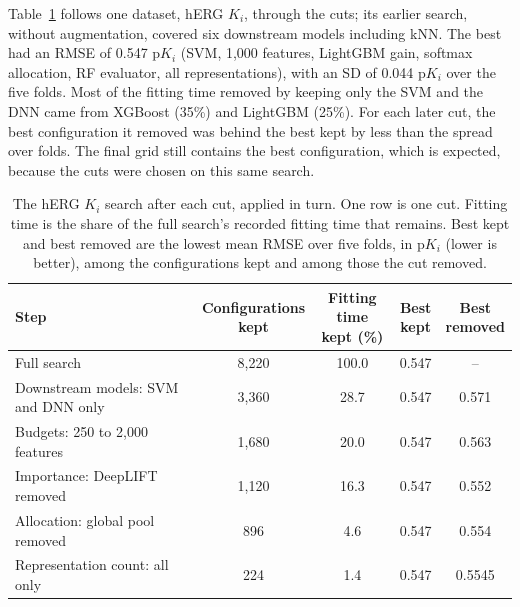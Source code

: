 \label{app:add:cut_walkthrough}
Table~\ref{tab:cut_walkthrough} follows one dataset, hERG $K_i$, through the cuts; its earlier search, without augmentation, covered six downstream models including kNN. The best had an RMSE of 0.547 p$K_i$ (SVM, 1,000 features, LightGBM gain, softmax allocation, RF evaluator, all representations), with an SD of 0.044 p$K_i$ over the five folds. Most of the fitting time removed by keeping only the SVM and the DNN came from XGBoost (35\%) and LightGBM (25\%). For each later cut, the best configuration it removed was behind the best kept by less than the spread over folds. The final grid still contains the best configuration, which is expected, because the cuts were chosen on this same search.

\begin{table}[htbp]
\centering
\small
\begin{adjustbox}{max width=\textwidth,max totalheight=0.78\textheight}
\begin{tabular}{@{}lcccc@{}}
\toprule
Step & \makecell{Configurations\\kept} & \makecell{Fitting time\\kept (\%)} & \makecell{Best\\kept} & \makecell{Best\\removed} \\
\midrule
Full search & 8{,}220 & 100.0 & 0.547 & -- \\
Downstream models: SVM and DNN only & 3{,}360 & 28.7 & 0.547 & 0.571 \\
Budgets: 250 to 2{,}000 features & 1{,}680 & 20.0 & 0.547 & 0.563 \\
Importance: DeepLIFT removed & 1{,}120 & 16.3 & 0.547 & 0.552 \\
Allocation: global pool removed & 896 & 4.6 & 0.547 & 0.554 \\
Representation count: all only & 224 & 1.4 & 0.547 & 0.5545 \\
\bottomrule
\end{tabular}
\end{adjustbox}
\caption[What each cut removes from the hERG $K_i$ search.]{The hERG $K_i$ search after each cut, applied in turn. One row is one cut. Fitting time is the share of the full search's recorded fitting time that remains. Best kept and best removed are the lowest mean RMSE over five folds, in p$K_i$ (lower is better), among the configurations kept and among those the cut removed.}
\label{tab:cut_walkthrough}
\end{table}

